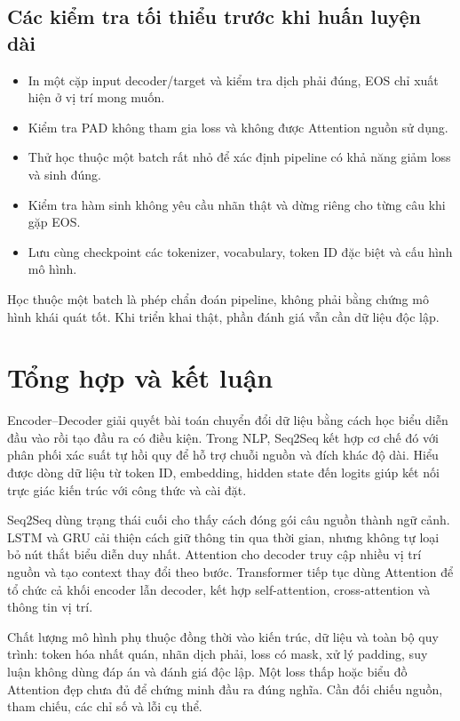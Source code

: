 \documentclass[11pt,a4paper]{article}
\numberwithin{equation}{section}
\begin{document}
\subsection{Các kiểm tra tối thiểu trước khi huấn luyện dài}
\begin{itemize}
\item In một cặp input decoder/target và kiểm tra dịch phải đúng, EOS chỉ xuất hiện ở vị trí mong muốn.
\item Kiểm tra PAD không tham gia loss và không được Attention nguồn sử dụng.
\item Thử học thuộc một batch rất nhỏ để xác định pipeline có khả năng giảm loss và sinh đúng.
\item Kiểm tra hàm sinh không yêu cầu nhãn thật và dừng riêng cho từng câu khi gặp EOS.
\item Lưu cùng checkpoint các tokenizer, vocabulary, token ID đặc biệt và cấu hình mô hình.
\end{itemize}
Học thuộc một batch là phép chẩn đoán pipeline, không phải bằng chứng mô hình khái quát tốt. Khi triển khai thật, phần đánh giá vẫn cần dữ liệu độc lập.

\clearpage
\section{Tổng hợp và kết luận}
Encoder--Decoder giải quyết bài toán chuyển đổi dữ liệu bằng cách học biểu diễn đầu vào rồi tạo đầu ra có điều kiện. Trong NLP, Seq2Seq kết hợp cơ chế đó với phân phối xác suất tự hồi quy để hỗ trợ chuỗi nguồn và đích khác độ dài. Hiểu được dòng dữ liệu từ token ID, embedding, hidden state đến logits giúp kết nối trực giác kiến trúc với công thức và cài đặt.

Seq2Seq dùng trạng thái cuối cho thấy cách đóng gói câu nguồn thành ngữ cảnh. LSTM và GRU cải thiện cách giữ thông tin qua thời gian, nhưng không tự loại bỏ nút thắt biểu diễn duy nhất. Attention cho decoder truy cập nhiều vị trí nguồn và tạo context thay đổi theo bước. Transformer tiếp tục dùng Attention để tổ chức cả khối encoder lẫn decoder, kết hợp self-attention, cross-attention và thông tin vị trí.

Chất lượng mô hình phụ thuộc đồng thời vào kiến trúc, dữ liệu và toàn bộ quy trình: token hóa nhất quán, nhãn dịch phải, loss có mask, xử lý padding, suy luận không dùng đáp án và đánh giá độc lập. Một loss thấp hoặc biểu đồ Attention đẹp chưa đủ để chứng minh đầu ra đúng nghĩa. Cần đối chiếu nguồn, tham chiếu, các chỉ số và lỗi cụ thể.
\end{document}
